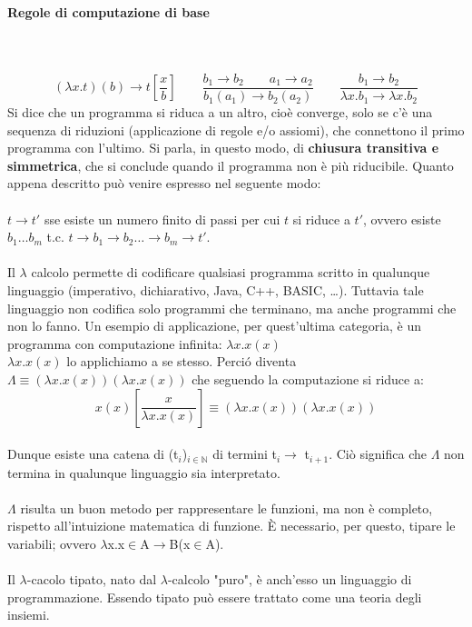 \paragraph{Regole di computazione di base}\mbox{}\\\\ 
\[ (\lambda x.t)(b) \rightarrow t[\frac{x}{b}] \qquad
\frac{b_1 \rightarrow b_2	\qquad a_1 \rightarrow a_2 }{b_1(a_1) \rightarrow b_2(a_2)} \qquad 
\frac{b_1 \rightarrow b_2}{\lambda x.b_1 \rightarrow \lambda x.b_2} \]
\noindent
Si dice che un programma si riduca a un altro, cio\`e converge, solo se c'\`e una sequenza di riduzioni (applicazione di regole e/o assiomi), che connettono il primo programma con l'ultimo. Si parla, in questo modo, di \textbf{chiusura transitiva e simmetrica}, che si conclude quando il programma non \`e pi\`u riducibile. Quanto appena descritto pu\`o venire espresso nel seguente modo:\\\\ $t \rightarrow t'$ sse esiste un numero finito di passi per cui $t$ si riduce a $t'$, ovvero esiste $b_1 \dots b_m$ t.c. $t \rightarrow b_1 \rightarrow b_2 \dots \rightarrow b_m \rightarrow t'$.\\\\
Il $\lambda$ calcolo permette di codificare qualsiasi programma scritto in qualunque linguaggio (imperativo, dichiarativo, Java, C++, BASIC, \dots). Tuttavia tale linguaggio non codifica solo programmi che terminano, ma anche programmi che non lo fanno.
Un esempio di applicazione, per quest'ultima categoria, \`e un programma con computazione infinita: $\lambda x.x(x)$\\
$\lambda x.x(x)$ lo applichiamo a se stesso. Perci\'o diventa $\Lambda \equiv (\lambda x.x(x))(\lambda x.x(x))$
che seguendo la computazione si riduce a: \[x(x)[\frac{x}{\lambda x.x(x)}] \equiv (\lambda x.x(x))(\lambda x.x(x))\]\\
Dunque esiste una catena di (t$_i$)$_{i\in\mathbb{N}}$ di termini t$_i \rightarrow$ t$_{i+1}$. Ci\`o significa che
$\Lambda$ non termina in qualunque linguaggio sia interpretato.\\\\
$\Lambda$ risulta un buon metodo per rappresentare le funzioni, ma non \`e completo, rispetto all'intuizione matematica di funzione. \`E necessario, per questo, tipare le variabili; ovvero $\lambda$x.x$\in$A$\rightarrow$B(x$\in$A).\\\\
Il $\lambda$-cacolo tipato, nato dal $\lambda$-calcolo "puro", \`e anch'esso un linguaggio di programmazione. Essendo tipato pu\`o essere trattato come una teoria degli insiemi.

